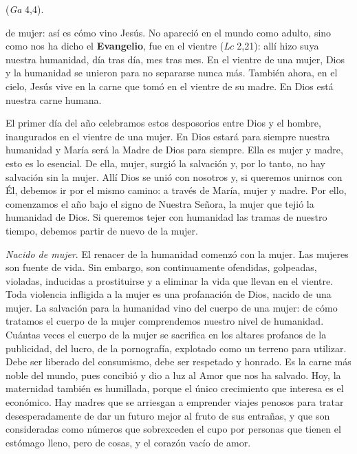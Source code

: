 \begin{body}
	 (\emph{Ga} 4,4). 
	
	 de mujer: así es cómo vino Jesús. No apareció en el mundo como adulto, sino como nos ha dicho el \textbf{Evangelio}, fue  en el vientre (\emph{Lc} 2,21): allí hizo suya nuestra humanidad, día tras día, mes tras mes. En el vientre de una mujer, Dios y la humanidad se unieron para no separarse nunca más. También ahora, en el cielo, Jesús vive en la carne que tomó en el vientre de su madre. En Dios está nuestra carne humana.
	
	El primer día del año celebramos estos desposorios entre Dios y el hombre, inaugurados en el vientre de una mujer. En Dios estará para siempre nuestra humanidad y María será la Madre de Dios para siempre. Ella es mujer y madre, esto es lo esencial. De ella, mujer, surgió la salvación y, por lo tanto, no hay salvación sin la mujer. Allí Dios se unió con nosotros y, si queremos unirnos con Él, debemos ir por el mismo camino: a través de María, mujer y madre. Por ello, comenzamos el año bajo el signo de Nuestra Señora, la mujer que tejió la humanidad de Dios. Si queremos tejer con humanidad las tramas de nuestro tiempo, debemos partir de nuevo de la mujer.
	
	\emph{Nacido de mujer}. El renacer de la humanidad comenzó con la mujer. Las mujeres son fuente de vida. Sin embargo, son continuamente ofendidas, golpeadas, violadas, inducidas a prostituirse y a eliminar la vida que llevan en el vientre. Toda violencia infligida a la mujer es una profanación de Dios, nacido de una mujer. La salvación para la humanidad vino del cuerpo de una mujer: de cómo tratamos el cuerpo de la mujer comprendemos nuestro nivel de humanidad. Cuántas veces el cuerpo de la mujer se sacrifica en los altares profanos de la publicidad, del lucro, de la pornografía, explotado como un terreno para utilizar. Debe ser liberado del consumismo, debe ser respetado y honrado. Es la carne más noble del mundo, pues concibió y dio a luz al Amor que nos ha salvado. Hoy, la maternidad también es humillada, porque el único crecimiento que interesa es el económico. Hay madres que se arriesgan a emprender viajes penosos para tratar desesperadamente de dar un futuro mejor al fruto de sus entrañas, y que son consideradas como números que sobrexceden el cupo por personas que tienen el estómago lleno, pero de cosas, y el corazón vacío de amor.
	

\end{body}
